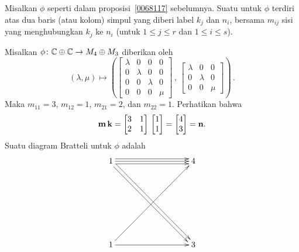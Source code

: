 \begin{defn} Misalkan $\phi$ seperti dalam proposisi~\ref{0068117} sebelumnya. Suatu
 untuk $\phi$ terdiri atas dua baris (atau kolom) simpul yang diberi label
$k_j$ dan $n_i$, bersama $m_{ij}$ sisi yang menghubungkan $k_j$ ke $n_i$ (untuk $1 \le j \le
r$ dan $1 \le i \le s$).
\end{defn}

\begin{exam} Misalkan $\phi\colon \mathbb{C} \oplus \mathbb{C} \rightarrow M_4 \oplus M_3$ diberikan oleh
 \[ (\lambda, \mu) \mapsto \left(
      \begin{bmatrix}
        \lambda & 0 & 0 & 0 \\
        0 & \lambda & 0 & 0 \\
        0 & 0 & \lambda & 0 \\
        0 & 0 & 0 & \mu
      \end{bmatrix}\, , \,
      \begin{bmatrix}
        \lambda & 0 & 0 \\
        0 & \lambda & 0 \\
        0 & 0 & \mu
      \end{bmatrix}\right)\, .\]
Maka $m_{11} = 3$, $m_{12} = 1$, $m_{21} = 2$, dan $m_{22} = 1$. Perhatikan bahwa
   \[\mathbf{m} \,\mathbf{k} = \begin{bmatrix} 3 & 1 \\ 2 & 1 \end{bmatrix}\,
             \begin{bmatrix} 1 \\ 1 \end{bmatrix} =
             \begin{bmatrix} 4 \\ 3 \end{bmatrix} = \mathbf{n}.\]
Suatu diagram Bratteli untuk $\phi$ adalah
    \[\xymatrix@=90pt{1 \ar@<.7ex>[r]\ar[r]\ar@<-.7ex>[r]\ar@<.5ex>[dr]\ar@<-.5ex>[dr] & 4 \\
                1 \ar[ur]\ar[r] & 3
     }\]
\end{exam}

